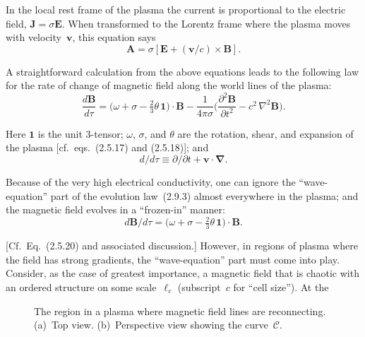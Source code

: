 In the local rest frame of the plasma the current is proportional to the electric
field, $\mathbf{J} = \sigma\mathbf{E}$.  When transformed to the Lorentz frame where the plasma moves
with velocity~$\mathbf{v}$, this equation says
%
\begin{equation}
\mathbf{A} = \sigma\!\left[\mathbf{E} + (\mathbf{v}/c)\times\mathbf{B}\right].
\tag{2.9.2}
\end{equation}

A straightforward calculation from the above equations leads to the following
law for the rate of change of magnetic field along the world lines of the plasma:
%
\begin{equation}
\frac{d\mathbf{B}}{d\tau}
  = \bigl(\omega + \sigma - \tfrac{2}{3}\theta\,\mathbf{1}\bigr)\cdot\mathbf{B}
  - \frac{1}{4\pi\sigma}
    \biggl(\frac{\partial^{2}\mathbf{B}}{\partial t^{2}} - c^{2}\,\nabla^{2}\mathbf{B}\biggr).
\tag{2.9.3}
\end{equation}

Here $\mathbf{1}$ is the unit 3-tensor; $\omega$, $\sigma$, and $\theta$ are the rotation, shear, and
expansion of the plasma [cf.\ eqs.~(2.5.17) and (2.5.18)]; and
%
\begin{equation}
d/d\tau \equiv \partial/\partial t + \mathbf{v}\cdot\boldsymbol{\nabla}.
\tag{2.9.4}
\end{equation}

Because of the very high electrical conductivity, one can ignore the
``wave-equation'' part of the evolution law~(2.9.3) almost everywhere in the
plasma; and the magnetic field evolves in a ``frozen-in'' manner:
%
\begin{equation}
d\mathbf{B}/d\tau
  = \bigl(\omega + \sigma - \tfrac{2}{3}\theta\,\mathbf{1}\bigr)\cdot\mathbf{B}.
\tag{2.9.5}
\end{equation}


[Cf.\ Eq.~(2.5.20) and associated discussion.]  However, in regions of plasma
where the field has strong gradients, the ``wave-equation'' part must come into
play.  Consider, as the case of greatest importance, a magnetic field that is
chaotic with an ordered structure on some scale~$\ell_c$ (subscript~$c$ for
``cell size'').  At the

\begin{figure}[htbp]
\centering
\caption{The region in a plasma where magnetic field lines are reconnecting.
(a)~Top view.  (b)~Perspective view showing the curve~$\mathscr{C}$.}
\label{fig:2.9.1}
\end{figure}

